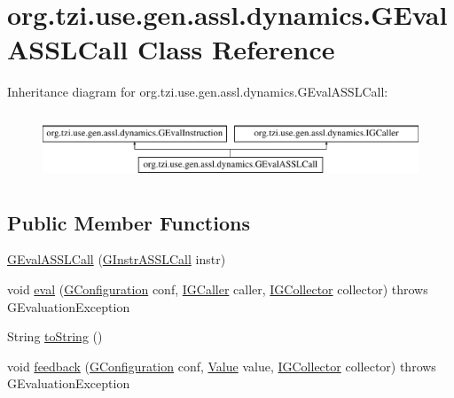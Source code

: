 \hypertarget{classorg_1_1tzi_1_1use_1_1gen_1_1assl_1_1dynamics_1_1_g_eval_a_s_s_l_call}{\section{org.\-tzi.\-use.\-gen.\-assl.\-dynamics.\-G\-Eval\-A\-S\-S\-L\-Call Class Reference}
\label{classorg_1_1tzi_1_1use_1_1gen_1_1assl_1_1dynamics_1_1_g_eval_a_s_s_l_call}
}
Inheritance diagram for org.\-tzi.\-use.\-gen.\-assl.\-dynamics.\-G\-Eval\-A\-S\-S\-L\-Call\-:\begin{figure}[H]
\begin{center}
\leavevmode
\includegraphics[height=1.978799cm]{classorg_1_1tzi_1_1use_1_1gen_1_1assl_1_1dynamics_1_1_g_eval_a_s_s_l_call}
\end{center}
\end{figure}
\subsection*{Public Member Functions}
\begin{DoxyCompactItemize}
\item 
\hyperlink{classorg_1_1tzi_1_1use_1_1gen_1_1assl_1_1dynamics_1_1_g_eval_a_s_s_l_call_a2a4e594fcf8e50d216b0c2c3a8586598}{G\-Eval\-A\-S\-S\-L\-Call} (\hyperlink{classorg_1_1tzi_1_1use_1_1gen_1_1assl_1_1statics_1_1_g_instr_a_s_s_l_call}{G\-Instr\-A\-S\-S\-L\-Call} instr)
\item 
void \hyperlink{classorg_1_1tzi_1_1use_1_1gen_1_1assl_1_1dynamics_1_1_g_eval_a_s_s_l_call_a27196f0aeb85c00a0d397a868be4a67c}{eval} (\hyperlink{classorg_1_1tzi_1_1use_1_1gen_1_1assl_1_1dynamics_1_1_g_configuration}{G\-Configuration} conf, \hyperlink{interfaceorg_1_1tzi_1_1use_1_1gen_1_1assl_1_1dynamics_1_1_i_g_caller}{I\-G\-Caller} caller, \hyperlink{interfaceorg_1_1tzi_1_1use_1_1gen_1_1assl_1_1dynamics_1_1_i_g_collector}{I\-G\-Collector} collector)  throws G\-Evaluation\-Exception 
\item 
String \hyperlink{classorg_1_1tzi_1_1use_1_1gen_1_1assl_1_1dynamics_1_1_g_eval_a_s_s_l_call_a6857ffdf47efa524cc7c0e94216e22f2}{to\-String} ()
\item 
void \hyperlink{classorg_1_1tzi_1_1use_1_1gen_1_1assl_1_1dynamics_1_1_g_eval_a_s_s_l_call_aca1c2ba5bf21f3ca9febc50eb736f188}{feedback} (\hyperlink{classorg_1_1tzi_1_1use_1_1gen_1_1assl_1_1dynamics_1_1_g_configuration}{G\-Configuration} conf, \hyperlink{classorg_1_1tzi_1_1use_1_1uml_1_1ocl_1_1value_1_1_value}{Value} value, \hyperlink{interfaceorg_1_1tzi_1_1use_1_1gen_1_1assl_1_1dynamics_1_1_i_g_collector}{I\-G\-Collector} collector)  throws G\-Evaluation\-Exception 
\end{DoxyCompactItemize}
